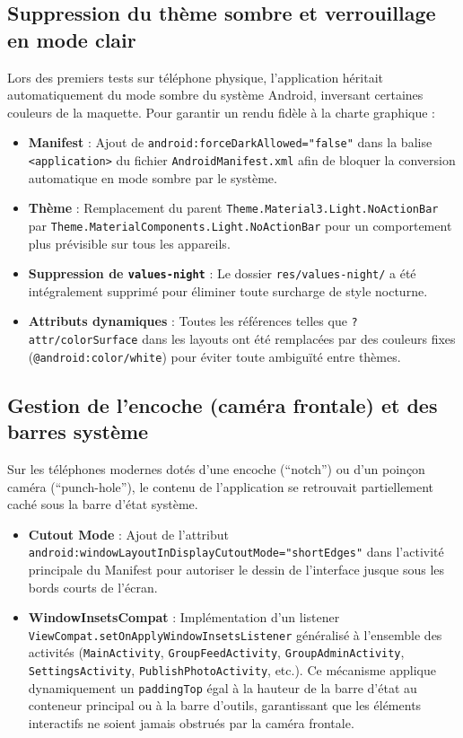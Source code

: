\documentclass{article}
\begin{document}
\subsection{Suppression du thème sombre et verrouillage en mode clair}
Lors des premiers tests sur téléphone physique, l'application héritait automatiquement du mode sombre du système Android, inversant certaines couleurs de la maquette. Pour garantir un rendu fidèle à la charte graphique :
\begin{itemize}
    \item \textbf{Manifest} : Ajout de \texttt{android:forceDarkAllowed="false"} dans la balise \texttt{<application>} du fichier \texttt{AndroidManifest.xml} afin de bloquer la conversion automatique en mode sombre par le système.
    \item \textbf{Thème} : Remplacement du parent \texttt{Theme.Material3.Light.NoActionBar} par \texttt{Theme.MaterialComponents.Light.NoActionBar} pour un comportement plus prévisible sur tous les appareils.
    \item \textbf{Suppression de \texttt{values-night}} : Le dossier \texttt{res/values-night/} a été intégralement supprimé pour éliminer toute surcharge de style nocturne.
    \item \textbf{Attributs dynamiques} : Toutes les références telles que \texttt{?attr/colorSurface} dans les layouts ont été remplacées par des couleurs fixes (\texttt{@android:color/white}) pour éviter toute ambiguïté entre thèmes.
\end{itemize}

\subsection{Gestion de l'encoche (caméra frontale) et des barres système}
Sur les téléphones modernes dotés d'une encoche (``notch'') ou d'un poinçon caméra (``punch-hole''), le contenu de l'application se retrouvait partiellement caché sous la barre d'état système.
\begin{itemize}
    \item \textbf{Cutout Mode} : Ajout de l'attribut \texttt{android:windowLayoutInDisplayCutoutMode="shortEdges"} dans l'activité principale du Manifest pour autoriser le dessin de l'interface jusque sous les bords courts de l'écran.
    \item \textbf{WindowInsetsCompat} : Implémentation d'un listener \texttt{ViewCompat.setOnApplyWindowInsetsListener} généralisé à l'ensemble des activités (\texttt{MainActivity}, \texttt{GroupFeedActivity}, \texttt{GroupAdminActivity}, \texttt{SettingsActivity}, \texttt{PublishPhotoActivity}, etc.). Ce mécanisme applique dynamiquement un \texttt{paddingTop} égal à la hauteur de la barre d'état au conteneur principal ou à la barre d'outils, garantissant que les éléments interactifs ne soient jamais obstrués par la caméra frontale.
\end{itemize}
\end{document}
